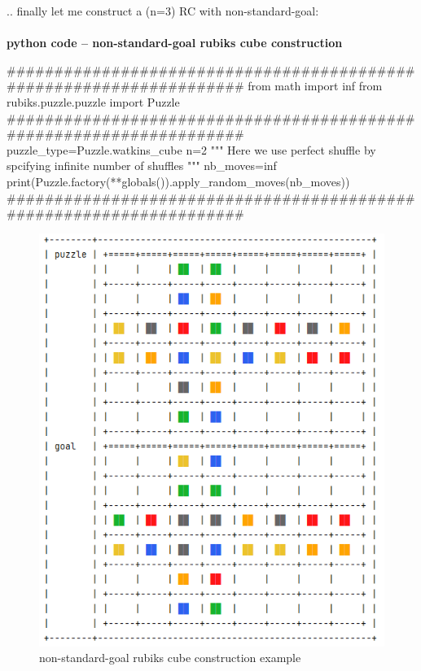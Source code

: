 .. finally let me construct a (n=3) RC with non-standard-goal:
\afblue
\paragraph{}{\textbf{python code -- non-standard-goal rubiks cube construction}}
\begin{python}
####################################################################
from math import inf
from rubiks.puzzle.puzzle import Puzzle
####################################################################
puzzle_type=Puzzle.watkins_cube
n=2
""" Here we use perfect shuffle by spcifying infinite number of shuffles """
nb_moves=inf
print(Puzzle.factory(**globals()).apply_random_moves(nb_moves))
####################################################################
\end{python}
\black

\begin{figure}[H]
\centering
\includegraphics[scale=0.8]{./Figures/examplewcconstruction}
\caption[Examples]{non-standard-goal rubiks cube construction example}
\label{fig:examplewcconstruction}
\end{figure}


